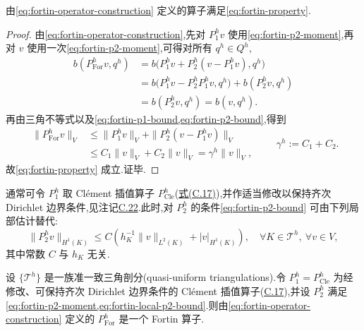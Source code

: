 \begin{lemma}[算子(3.87)的性质]\label{lem:fortin-operator-construction}
由\cref{eq:fortin-operator-construction} 定义的算子满足\cref{eq:fortin-property}.
\end{lemma}

\begin{proof}
由\cref{eq:fortin-operator-construction},先对 $P_1^h v$ 使用\cref{eq:fortin-p2-moment},再对 $v$ 使用一次\cref{eq:fortin-p2-moment},可得对所有 $q^h\in Q^h$,
\[
\begin{aligned}
  b(P_{\mathrm{For}}^h v,q^h)
  &=b\bigl(P_1^h v+P_2^h(v-P_1^h v),q^h\bigr)\\
  &=b\bigl(P_1^h v-P_2^hP_1^h v,q^h\bigr)
    +b(P_2^h v,q^h)\\
  &=b(P_2^h v,q^h)=b(v,q^h).
\end{aligned}
\]
再由三角不等式以及\cref{eq:fortin-p1-bound,eq:fortin-p2-bound},得到
\[
\begin{aligned}
  \|P_{\mathrm{For}}^h v\|_V
  &\le \|P_1^h v\|_V+
        \|P_2^h(v-P_1^h v)\|_V\\
  &\le C_1\|v\|_V+C_2\|v\|_V
   =\gamma^h\|v\|_V,
\end{aligned}
\qquad\gamma^h:=C_1+C_2.
\]
故\cref{eq:fortin-property} 成立.证毕.
\end{proof}

\begin{note}\label{note:fortin-detailed-construction}
通常可令 $P_1^h$ 取 Clément 插值算子 $P_{\mathrm{Cle}}^h$(\hyperref[eq:appendix-c-17]{式(C.17)}),并作适当修改以保持齐次 Dirichlet 边界条件,见注记\hyperref[note:appendix-c-22]{C.22}.此时,对 $P_2^h$ 的条件\cref{eq:fortin-p2-bound} 可由下列局部估计替代:
\begin{equation}\label{eq:fortin-local-p2-bound}
  \|P_2^h v\|_{H^1(K)}
  \le C\left(h_K^{-1}\|v\|_{L^2(K)}
              +|v|_{H^1(K)}\right),
  \quad\forall K\in\mathcal{T}^h,\ \forall v\in V,
\end{equation}
其中常数 $C$ 与 $h_K$ 无关.
\end{note}

\begin{lemma}\label{lem:clement-fortin-property}
设 $\{\mathcal{T}^h\}$ 是一族准一致三角剖分(quasi-uniform triangulations).令 $P_1^h=P_{\mathrm{Cle}}^h$ 为经修改、可保持齐次 Dirichlet 边界条件的 Clément 插值算子(\hyperref[eq:appendix-c-17]{C.17}),并设 $P_2^h$ 满足\cref{eq:fortin-p2-moment,eq:fortin-local-p2-bound}.则由\cref{eq:fortin-operator-construction} 定义的 $P_{\mathrm{For}}^h$ 是一个 Fortin 算子.
\end{lemma}

